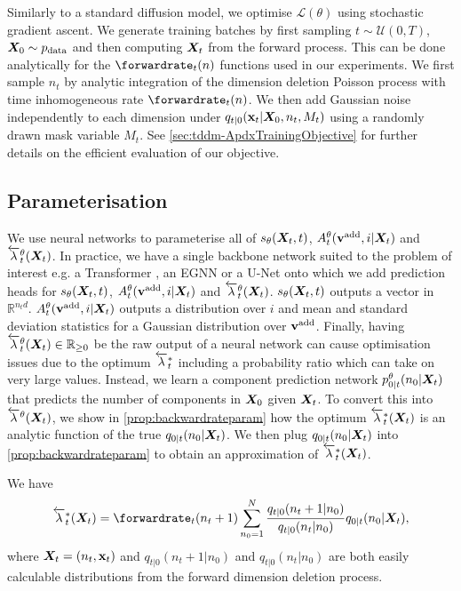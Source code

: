 Similarly to a standard diffusion model, we optimise $\mathcal{L}(\theta)$ using stochastic gradient ascent. We generate training batches by first sampling $t \sim \mathcal{U}(0, T)$, ${\bm{X}}_0 \sim p_{\rm{data}}$ and then computing ${\bm{X}}_t$ from  the forward process. This can be done analytically for the $\forwardrate_t(n)$ functions used in our experiments. We first sample $n_t$ by analytic integration of the dimension deletion Poisson process with time inhomogeneous rate $\forwardrate_t(n)$. We then add Gaussian noise independently to each dimension under $q_{t|0}({\mathbf{x}}_t | {\bm{X}}_0, n_t, M_t)$ using a randomly drawn mask variable $M_t$. See \cref{sec:tddm-ApdxTrainingObjective} for further details on the efficient evaluation of our objective.

\subsection{Parameterisation}

We use neural networks to parameterise all of $s_\theta({\bm{X}}_t, t)$, $A_t^\theta({\mathbf{v}}^{\textup{add}}, i | {\bm{X}}_t)$ and $\overleftarrow{\lambda}_t^\theta({\bm{X}}_t)$. In practice, we have a single backbone network suited to the problem of interest e.g. a Transformer \cite{vaswani2017attention}, an EGNN \cite{satorras2021n} or a U-Net \cite{ronneberger2015u} onto which we add prediction heads for $s_\theta({\bm{X}}_t, t)$, $A_t^\theta({\mathbf{v}}^{\textup{add}}, i | {\bm{X}}_t)$ and $\overleftarrow{\lambda}_t^\theta({\bm{X}}_t)$. $s_\theta({\bm{X}}_t, t)$ outputs a vector in $\mathbb{R}^{n_t d}$. $A_t^\theta({\mathbf{v}}^{\textup{add}}, i | {\bm{X}}_t)$ outputs a distribution over $i$ and mean and standard deviation statistics for a Gaussian distribution over ${\mathbf{v}}^{\textup{add}}$. Finally, having $\overleftarrow{\lambda}_t^\theta({\bm{X}}_t) \in \mathbb{R}_{\geq 0}$ be the raw output of a neural network can cause optimisation issues due to the optimum $\overleftarrow{\lambda}^*_t$ including a probability ratio which can take on very large values. Instead, we learn a component prediction network $p^\theta_{0|t}(n_0 | {\bm{X}}_t)$ that predicts the number of components in ${\bm{X}}_0$ given ${\bm{X}}_t$. To convert this into $\overleftarrow{\lambda}^\theta({\bm{X}}_t)$, we show in \cref{prop:backwardrateparam} how the optimum $\overleftarrow{\lambda}_t^*({\bm{X}}_t)$ is an analytic function of the true $q_{0|t}(n_0 | {\bm{X}}_t)$. We then plug $q_{0|t}(n_0 | {\bm{X}}_t)$ into \cref{prop:backwardrateparam} to obtain an approximation of $\overleftarrow{\lambda}_t^*({\bm{X}}_t)$.
\begin{proposition} We have
    \label{prop:backwardrateparam}
    \begin{equation}\label{eq:backwardrateparam}
        \backwardrate_{t}^*(\mX_t) = \forwardrate_{t}(n_t+1) \sum_{n_0=1}^N \frac{q_{t|0}(n_t + 1 | n_0)}{q_{t|0}(n_t | n_0)} q_{0|t}(n_0 | \mX_t),
    \end{equation}
    where ${\bm{X}}_t = (n_t, {\mathbf{x}}_t)$ and $q_{t|0}(n_t + 1 | n_0)$ and $q_{t|0}(n_t | n_0)$ are both easily calculable distributions from the forward dimension deletion process.
\end{proposition}



